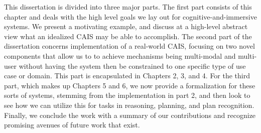 This dissertation is divided into three major parts. The first part
consists of this chapter and deals with the high level goals we lay
out for cognitive-and-immersive systems. We present a motivating
example, and discuss at a high-level abstract view what an idealized
CAIS may be able to accomplish. The second part of the dissertation
concerns implementation of a real-world CAIS, focusing on two novel
components that allow us to to achieve mechanisms being multi-modal
and multi-user without having the system then be constrained to one
specific type of use case or domain. This part is encapsulated in
Chapters 2, 3, and 4. For the third part, which makes up Chapters 5
and 6, we now provide a formalization for these sorts of systems,
stemming from the implementation in part 2, and then look to see how we
can utilize this for tasks in reasoning, planning, and plan
recognition. Finally, we conclude the work with a summary of our
contributions and recognize promising avenues of future work that
exist.
